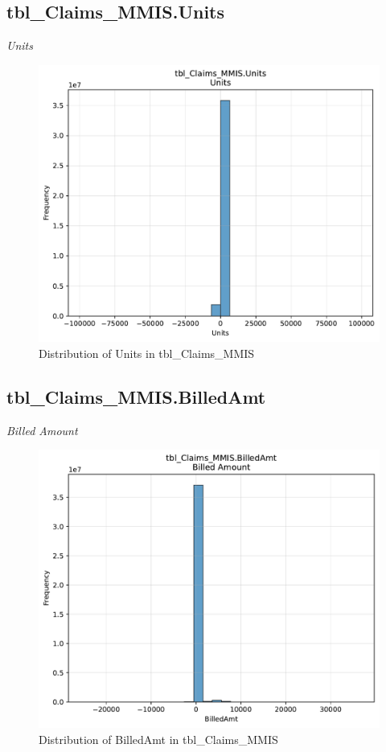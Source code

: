 \subsection{tbl\_Claims\_MMIS.Units}
\textit{Units}

\begin{figure}[htbp]
\centering
\includegraphics[width=\textwidth]{figures/dbo_tbl_Claims_MMIS_Units.pdf}
\caption{Distribution of Units in tbl\_Claims\_MMIS}
\end{figure}\newpage

\subsection{tbl\_Claims\_MMIS.BilledAmt}
\textit{Billed Amount}

\begin{figure}[htbp]
\centering
\includegraphics[width=\textwidth]{figures/dbo_tbl_Claims_MMIS_BilledAmt.pdf}
\caption{Distribution of BilledAmt in tbl\_Claims\_MMIS}
\end{figure}\newpage

